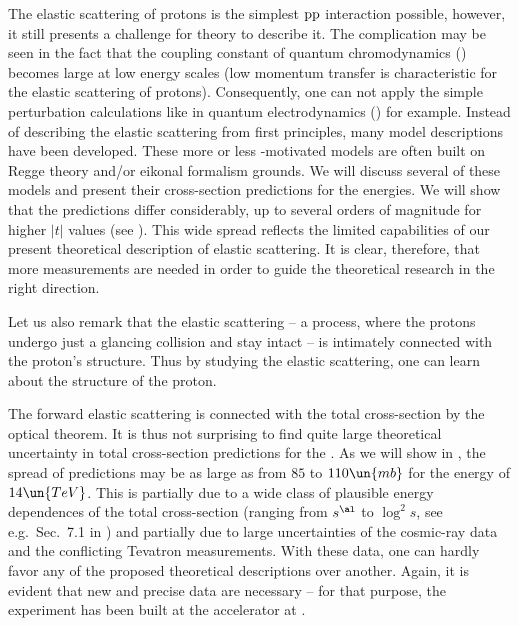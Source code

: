 \def\CaptionPrefix{I.}


The elastic scattering of protons is the simplest $\rm pp$ interaction possible, however, it still presents a challenge for theory to describe it. The complication may be seen in the fact that the coupling constant of quantum chromodynamics () becomes large at low energy scales (low momentum transfer is characteristic for the elastic scattering of protons). Consequently, one can not apply the simple perturbation calculations like in quantum electrodynamics () for example. Instead of describing the elastic scattering from first principles, many model descriptions have been developed. These more or less -motivated models are often built on Regge theory and/or eikonal formalism grounds. We will discuss several of these models and present their  cross-section predictions for the  energies. We will show that the predictions differ considerably, up to several orders of magnitude for higher $|t|$ values (see ). This wide spread reflects the limited capabilities of our present theoretical description of elastic scattering. It is clear, therefore, that more measurements are needed in order to guide the theoretical research in the right direction.

Let us also remark that the elastic scattering -- a process, where the protons undergo just a glancing collision and stay intact -- is intimately connected with the proton's structure. Thus by studying the elastic scattering, one can learn about the structure of the proton.

The forward elastic scattering is connected with the total cross-section by the optical theorem. It is thus not surprising to find quite large theoretical uncertainty in total cross-section predictions for the . As we will show in , the spread of predictions may be as large as from $85$ to $110\un{mb}$ for the energy of $14\un{TeV}$. This is partially due to a wide class of plausible energy dependences of the total cross-section (ranging from $s^{\al}$ to $\log^2 s$, see e.g.~Sec.~7.1 in ) and partially due to large uncertainties of the cosmic-ray data and the conflicting Tevatron measurements. With these data, one can hardly favor any of the proposed theoretical descriptions over another. Again, it is evident that new and precise data are necessary -- for that purpose, the  experiment has been built at the  accelerator at .

